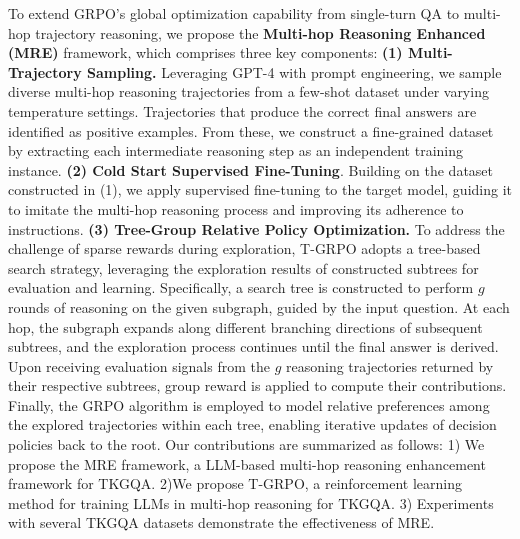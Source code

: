 \documentclass[letterpaper]{article} %
\begin{document}
To extend GRPO’s global optimization capability from single-turn QA to multi-hop trajectory reasoning, we propose the \textbf{Multi-hop Reasoning Enhanced (MRE)} framework, which comprises three key components:
\textbf{(1) Multi-Trajectory Sampling.} Leveraging GPT-4 with prompt engineering, we sample diverse multi-hop reasoning trajectories from a few-shot dataset under varying temperature settings. Trajectories that produce the correct final answers are identified as positive examples. From these, we construct a fine-grained dataset by extracting each intermediate reasoning step as an independent training instance.
\textbf{(2) Cold Start Supervised Fine-Tuning}. Building on the dataset constructed in (1), we apply supervised fine-tuning to the target model, guiding it to imitate the multi-hop reasoning process and improving its adherence to instructions. 
\textbf{(3) Tree-Group Relative Policy Optimization.} To address the challenge of sparse rewards during exploration, T-GRPO adopts a tree-based search strategy, leveraging the exploration results of constructed subtrees for evaluation and learning. Specifically, a search tree is constructed to perform $g$ rounds of reasoning on the given subgraph, guided by the input question. At each hop, the subgraph expands along different branching directions of subsequent subtrees, and the exploration process continues until the final answer is derived. Upon receiving evaluation signals from the $g$ reasoning trajectories returned by their respective subtrees, group reward is applied to compute their contributions. Finally, the GRPO algorithm is employed to model relative preferences among the explored trajectories within each tree, enabling iterative updates of decision policies back to the root.
Our contributions are summarized as follows:
1) We propose the MRE framework, a LLM-based multi-hop reasoning enhancement framework for TKGQA.
2)We propose T-GRPO, a reinforcement learning method for training LLMs in multi-hop reasoning for TKGQA.
3) Experiments with several TKGQA datasets demonstrate the effectiveness of MRE. 
\end{document}
